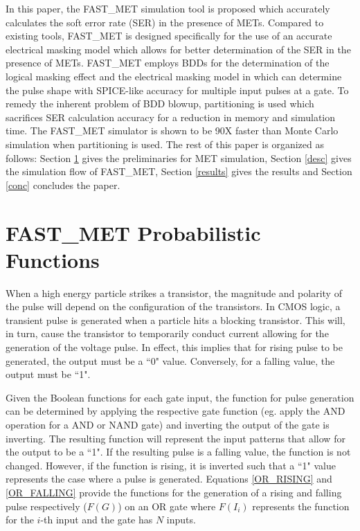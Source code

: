 \documentclass[conference]{IEEEtran}
\begin{document}
In this paper, the FAST\_MET simulation tool is proposed which accurately calculates the soft error rate (SER) in the presence of METs. Compared to existing tools, FAST\_MET is designed specifically for the use of an accurate electrical masking model which allows for better determination of the SER in the presence of METs. FAST\_MET employs BDDs for the determination of the logical masking effect and the electrical masking model in \cite{Watkins2016} which can determine the pulse shape with SPICE-like accuracy for multiple input pulses at a gate. To remedy the inherent problem of BDD blowup, partitioning is used which sacrifices SER calculation accuracy for a reduction in memory and simulation time. The FAST\_MET simulator is shown to be 90X faster than Monte Carlo simulation when partitioning is used. The rest of this paper is organized as follows: Section \ref{probfunc} gives the preliminaries for MET simulation, Section \ref{desc} gives the simulation flow of FAST\_MET, Section \ref{results} gives the results and Section \ref{conc} concludes the paper.

\section{FAST\_MET Probabilistic Functions} \label{probfunc}

When a high energy particle strikes a transistor, the magnitude and polarity of the pulse will depend on the configuration of the transistors. In CMOS logic, a transient pulse is generated when a particle hits a blocking transistor. This will, in turn, cause the transistor to temporarily conduct current allowing for the generation of the voltage pulse. In effect, this implies that for rising pulse to be generated, the output must be a ``0" value. Conversely, for a falling value, the output must be ``1". 

Given the Boolean functions for each gate input, the function for pulse generation can be determined by applying the respective gate function (eg. apply the AND operation for a AND or NAND gate) and inverting the output of the gate is inverting. The resulting function will represent the input patterns that allow for the output to be a ``1". If the resulting pulse is a falling value, the function is not changed. However, if the function is rising, it is inverted such that a ``1" value represents the case where a pulse is generated. Equations \ref{OR_RISING} and \ref{OR_FALLING} provide the functions for the generation of a rising and falling pulse respectively ($F(G)$) on an OR gate where $F(I_i)$ represents the function for the $i$-th input and the gate has $N$ inputs.
\end{document}
